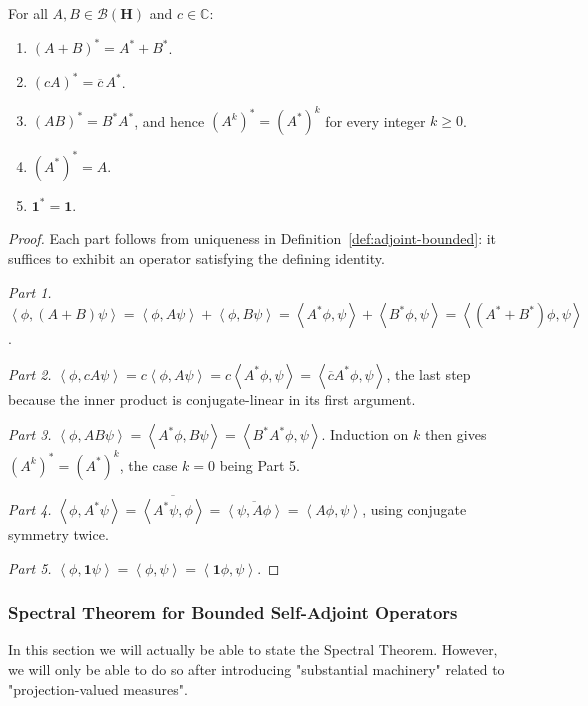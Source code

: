 \begin{lemma}
    \label{lmm:adjoint-algebra}
    \leanok
    For all $A, B \in \mathcal{B}(\mathbf{H})$ and $c \in \mathbb{C}$:
    \begin{enumerate}
        \item $(A + B)^* = A^* + B^*$.
        \item $(cA)^* = \overline{c}\,A^*$.
        \item $(AB)^* = B^*A^*$, and hence $(A^k)^* = (A^*)^k$ for every integer $k \ge 0$.
        \item $(A^*)^* = A$.
        \item $\mathbf{1}^* = \mathbf{1}$.
    \end{enumerate}
\end{lemma}
\begin{proof}
    \leanok
Each part follows from uniqueness in Definition~\ref{def:adjoint-bounded}: it suffices to exhibit an operator satisfying the defining identity.

\textit{Part 1.} $\left< \phi, (A+B)\psi \right> = \left< \phi, A\psi \right> + \left< \phi, B\psi \right> = \left< A^*\phi, \psi \right> + \left< B^*\phi, \psi \right> = \left< (A^*+B^*)\phi, \psi \right>$.

\textit{Part 2.} $\left< \phi, cA\psi \right> = c\left< \phi, A\psi \right> = c\left< A^*\phi, \psi \right> = \left< \overline{c}A^*\phi, \psi \right>$, the last step because the inner product is conjugate-linear in its first argument.

\textit{Part 3.} $\left< \phi, AB\psi \right> = \left< A^*\phi, B\psi \right> = \left< B^*A^*\phi, \psi \right>$. Induction on $k$ then gives $(A^k)^* = (A^*)^k$, the case $k=0$ being Part 5.

\textit{Part 4.} $\left< \phi, A^*\psi \right> = \overline{\left< A^*\psi, \phi \right>} = \overline{\left< \psi, A\phi \right>} = \left< A\phi, \psi \right>$, using conjugate symmetry twice.

\textit{Part 5.} $\left< \phi, \mathbf{1}\psi \right> = \left< \phi, \psi \right> = \left< \mathbf{1}\phi, \psi \right>$.
\end{proof}

\subsubsection{Spectral Theorem for Bounded Self-Adjoint Operators}
In this section we will actually be able to state the Spectral Theorem. However, we will only be able to do so after introducing "substantial machinery" related to "projection-valued measures".

